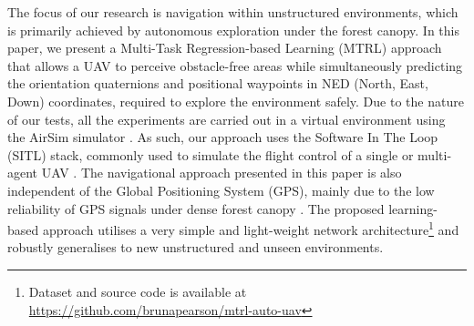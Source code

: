 \documentclass[letterpaper, 10 pt, journal, twoside]{IEEEtran}
\begin{document}
The focus of our research is navigation within unstructured environments, which is primarily achieved by autonomous exploration under the forest canopy. In this paper, we present a Multi-Task Regression-based Learning (MTRL) approach that allows a UAV to perceive obstacle-free areas while simultaneously predicting the orientation quaternions and positional waypoints in NED (North, East, Down) coordinates, required to explore the environment safely. Due to the nature of our tests, all the experiments are carried out in a virtual environment using the AirSim simulator \cite{shah2018airsim}. As such, our approach uses the Software In The Loop (SITL) \cite{hentati2018simulation} stack, commonly used to simulate the flight control of a single or multi-agent UAV \cite{lamping2018flymaster, hentati2018simulation}. The navigational approach presented in this paper is also independent of the Global Positioning System (GPS), mainly due to the low reliability of GPS signals under dense forest canopy \cite{perez2018architecture}. The proposed learning-based approach utilises a very simple and light-weight network architecture\footnote{Dataset and source code is available at \href{https://github.com/brunapearson/autoUAV-mtrl}{https://github.com/brunapearson/mtrl-auto-uav}} and robustly generalises to new unstructured and unseen environments. 
 
\end{document}
